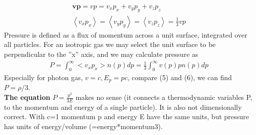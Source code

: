 \documentclass[answers]{exam}
\begin{document}
\begin{questions}
\begin{solution}
\begin{align*}
\mathbf{v p}=v p=v_{x} p_{x}+v_{y} p_{y}+v_{z} p_{z} \\
\left\langle v_{x} p_{x}\right\rangle=\left\langle v_{y} p_{y}\right\rangle=\left\langle v_{z} p_{z}\right\rangle=\frac{1}{3} v p    
\end{align*}
Pressure is defined as a flux of momentum across a unit surface, integrated over all particles.
For an isotropic gas we may select the unit surface to be perpendicular to the ”x” axis, and we may
calculate pressure as
\begin{align}
P=\int_{0}^{\infty}<v_{x} p_{x}>n(p) d p=\frac{1}{3} \int_{0}^{\infty} v(p) p n(p) d p
\end{align}
Especially for photon gas, $v = c, E_{p} = pc$, compare (5) and (6), we can find $P = \rho/3$.\vspace{5mm}\\
\textbf{The equation} $P=\frac{p^{2}}{3E}$ makes no sense (it connects a thermodynamic variables P, to the momentum 
and energy of a single particle). It is also not dimensionally correct. With c=1 momentum p and energy E have the same units, but pressure has units of energy/volume (=energy*momentum3).
\end{solution}








\end{questions}
\end{document}
